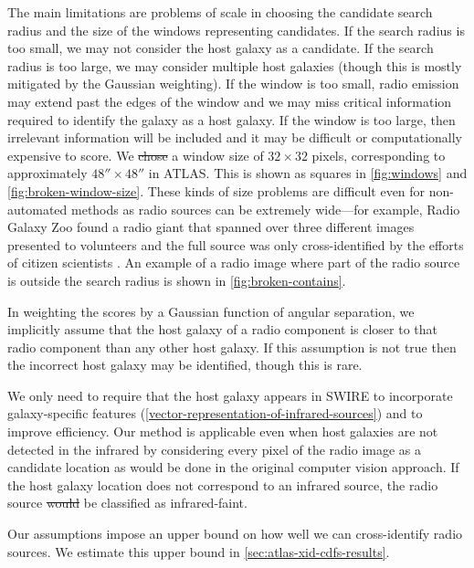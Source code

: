 \documentclass[11pt, a4paper]{book}
\providecommand{\DIFaddtex}[1]{{\protect\color{blue}\uwave{#1}}} %
\providecommand{\DIFdeltex}[1]{{\protect\color{red}\sout{#1}}}                      %
\providecommand{\DIFaddbegin}{} %
\providecommand{\DIFaddend}{} %
\providecommand{\DIFdelbegin}{} %
\providecommand{\DIFdelend}{} %
\providecommand{\DIFadd}[1]{\texorpdfstring{\DIFaddtex{#1}}{#1}} %
\providecommand{\DIFdel}[1]{\texorpdfstring{\DIFdeltex{#1}}{}} %
\newcommand{\DIFscaledelfig}{0.5}
\newlength{\DIFdelgraphicswidth} %
\newlength{\DIFdelgraphicsheight} %
\newcommand{\DIFaddincludegraphics}[2][]{{\color{blue}\fbox{\DIFOincludegraphics[#1]{#2}}}} %
\newcommand{\DIFdelincludegraphics}[2][]{%
\sbox{\DIFdelgraphicsbox}{\DIFOincludegraphics[#1]{#2}}%
\settoboxwidth{\DIFdelgraphicswidth}{\DIFdelgraphicsbox} %
\settoboxtotalheight{\DIFdelgraphicsheight}{\DIFdelgraphicsbox} %
\scalebox{\DIFscaledelfig}{%
\parbox[b]{\DIFdelgraphicswidth}{\usebox{\DIFdelgraphicsbox}\\[-\baselineskip] \rule{\DIFdelgraphicswidth}{0em}}\llap{\resizebox{\DIFdelgraphicswidth}{\DIFdelgraphicsheight}{%
\setlength{\unitlength}{\DIFdelgraphicswidth}%
\begin{picture}(1,1)%
\thicklines\linethickness{2pt} %
{\color[rgb]{1,0,0}\put(0,0){\framebox(1,1){}}}%
{\color[rgb]{1,0,0}\put(0,0){\line( 1,1){1}}}%
{\color[rgb]{1,0,0}\put(0,1){\line(1,-1){1}}}%
\end{picture}%
}\hspace*{3pt}}} %
} %
\DeclareRobustCommand{\DIFaddbegin}{\DIFOaddbegin \let\includegraphics\DIFaddincludegraphics} %
\DeclareRobustCommand{\DIFaddend}{\DIFOaddend \let\includegraphics\DIFOincludegraphics} %
\DeclareRobustCommand{\DIFdelbegin}{\DIFOdelbegin \let\includegraphics\DIFdelincludegraphics} %
\DeclareRobustCommand{\DIFdelend}{\DIFOaddend \let\includegraphics\DIFOincludegraphics} %
\begin{document}
    {The main limitations are problems of scale in choosing the
    candidate search radius and the size of the windows
    representing candidates. If the search radius is too small, we may not
    consider the host galaxy as a candidate. If the search radius is too
    large, we may consider multiple host galaxies (though this is mostly
    mitigated by the Gaussian weighting). If the window is too small, radio
    emission may extend past the edges of the window and we may miss critical
    information required to identify the galaxy as a host galaxy. If the
    window is too large, then irrelevant information will be included and it
    may be difficult or computationally expensive to score. We \DIFdelbegin \DIFdel{chose }\DIFdelend \DIFaddbegin \DIFadd{choose }\DIFaddend a
    window size of $32 \times 32$ pixels, corresponding to approximately $48'' \times 48''$ in
    ATLAS. This is shown as squares in \autoref{fig:windows} and
    \autoref{fig:broken-window-size}. These kinds of size problems are
    difficult even for non-automated methods as radio sources can be extremely
    wide---for example, Radio Galaxy Zoo found a radio giant that spanned
    over three different images presented to volunteers and the full source
    was only cross-identified by the efforts of citizen scientists
    \citep{banfield15}. An example of a radio image where part of the radio
    source is outside the search radius is shown in
    \autoref{fig:broken-contains}.}

    In weighting the scores by a Gaussian function of angular
    separation, we implicitly assume that the host galaxy of a radio component
    is closer to that radio component than any other host galaxy. If this
    assumption is not true then the incorrect host galaxy may be identified, though
    this is rare.

    We only need to require that the host galaxy appears in SWIRE to
    incorporate galaxy-specific features
    (\autoref{vector-representation-of-infrared-sources}) and to improve
    efficiency. Our method is applicable even when host galaxies are not detected in
    the infrared by considering every pixel of the radio image as a candidate
    location as would be done in the original computer vision approach. {If the host galaxy location does not correspond to an infrared source, the radio source \DIFdelbegin \DIFdel{would }\DIFdelend \DIFaddbegin \DIFadd{can }\DIFaddend be classified as infrared-faint.}

    Our assumptions impose an upper bound on how well we can cross-identify
    radio sources. We estimate this upper bound in \autoref{sec:atlas-xid-cdfs-results}.
\end{document}
